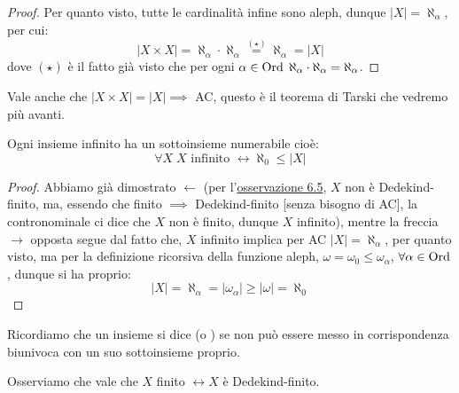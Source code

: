 \begin{proof}
	Per quanto visto, tutte le cardinalit\`a infine sono aleph, dunque $|X| = \aleph_\alpha$, per cui:
	\[ |X \times X| = \aleph_\alpha \cdot \aleph_\alpha \overset{(\star)}{=} \aleph_\alpha = |X|
		\]
	dove $(\star)$ \`e il fatto gi\`a visto che per ogni $\alpha \in \operatorname{Ord} \; \aleph_\alpha \cdot \aleph_\alpha = \aleph_\alpha$.
\end{proof}

\begin{note}
	Vale anche che $|X \times X| = |X| \implies$ AC, questo \`e il teorema di Tarski che vedremo pi\`u avanti.
\end{note}


\begin{corollary}
	Ogni insieme infinito ha un sottoinsieme numerabile cio\`e:
	\[ \forall X \; \text{$X$ infinito $\leftrightarrow \aleph_0 \leq |X|$}
		\]
\end{corollary}

\begin{proof}
	Abbiamo gi\`a dimostrato $\leftarrow$ (per l'\hyperref[omega_Dedekind_finito]{osservazione 6.5}, $X$ non \`e Dedekind-finito, ma, essendo che finito $\implies$ Dedekind-finito [senza bisogno di AC],
	la contronominale ci dice che $X$ non \`e finito, dunque $X$ infinito), mentre la freccia $\rightarrow$ opposta segue dal fatto che, $X$ infinito implica per AC $|X| = \aleph_\alpha$, per quanto visto,
	ma per la definizione ricorsiva della funzione aleph, $\omega = \omega_0 \leq \omega_\alpha$, $\forall \alpha \in \operatorname{Ord}$, dunque si ha proprio:
	\[ |X| = \aleph_\alpha = |\omega_\alpha| \geq |\omega| = \aleph_0
		\]
\end{proof}

Ricordiamo che un insieme si dice  (o ) se non pu\`o essere messo in corrispondenza biunivoca con un suo sottoinsieme proprio.

\begin{proposition}
	Osserviamo che vale che $X$ finito $\leftrightarrow X$ \`e Dedekind-finito.
\end{proposition}

